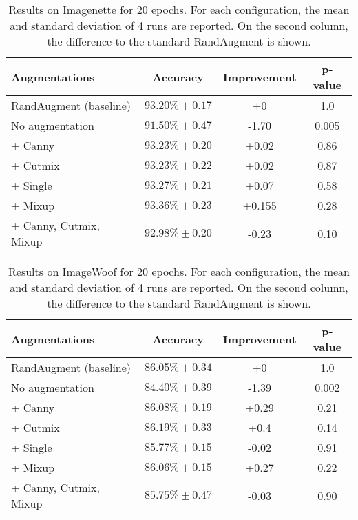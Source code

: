 \begin{table}[h]
    \centering
    \begin{tabular}{|l|c|c|c|}
        \hline
        \textbf{Augmentations} & \textbf{Accuracy} & \textbf{Improvement} & p-value \\
        \hline
        RandAugment (baseline) & $93.20\% \pm 0.17$ & +0 & 1.0 \\
        \hline
        \hline
        No augmentation & $91.50\% \pm 0.47$ & -1.70 &  0.005 \\
        \hline
        + Canny & $93.23\% \pm 0.20$ & +0.02 &  0.86 \\
        \hline
        + Cutmix & $93.23\% \pm 0.22$ & +0.02 & 0.87 \\
        \hline
        + Single & $93.27 \% \pm 0.21$ & +0.07 &  0.58 \\
        \hline
        + Mixup & $93.36\% \pm 0.23$ & +0.155 & 0.28 \\
        \hline
        \hline
        + Canny, Cutmix, Mixup & $92.98\% \pm 0.20$ & -0.23 & 0.10 \\
        \hline
    \end{tabular}
    \caption{Results on Imagenette for 20 epochs. For each configuration, the mean and standard deviation of 4 runs are reported. On the second column, the difference to the standard RandAugment is shown.}
    \label{tab:imagenette-randaugment}
\end{table}

\begin{table}[h]
    \centering
    \begin{tabular}{|l|c|c|c|}
        \hline
        \textbf{Augmentations} & \textbf{Accuracy} & \textbf{Improvement} & p-value \\
        \hline
        RandAugment (baseline) & $86.05\% \pm 0.34$ & +0 & 1.0 \\
        \hline
        \hline
        No augmentation & $84.40\% \pm 0.39$ & -1.39 &  0.002 \\
        \hline
        + Canny & $86.08\% \pm 0.19$ & +0.29 &  0.21 \\
        \hline
        + Cutmix & $86.19\% \pm 0.33$ & +0.4 & 0.14 \\
        \hline
        + Single & $85.77 \% \pm 0.15$ & -0.02 &  0.91 \\
        \hline
        + Mixup & $86.06\% \pm 0.15$ & +0.27 & 0.22 \\
        \hline
        \hline
        + Canny, Cutmix, Mixup & $85.75\% \pm 0.47$ & -0.03 & 0.90 \\
        \hline
    \end{tabular}
    \caption{Results on ImageWoof for 20 epochs. For each configuration, the mean and standard deviation of 4 runs are reported. On the second column, the difference to the standard RandAugment is shown.}
    \label{tab:imagenette-randaugment}
\end{table}

